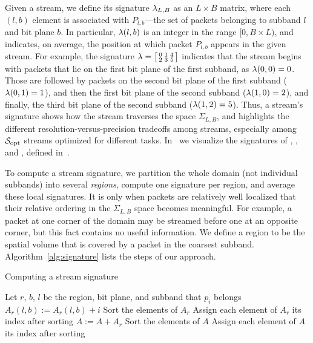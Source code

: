 Given a stream, we define its signature $\sgn_{L,B}$ as an $L \times B$ matrix, where each $(l,b)$
element is associated with $P_{l,b}$---the set of packets belonging to subband $l$ and bit plane
$b$. In particular, $\sgn(l,b)$ is an integer in the range $[0, B\times L)$, and indicates, on
average, the position at which packet $P_{l,b}$ appears in the given stream. For example, the
signature $\sgn=\bigl[ \begin{smallmatrix}0 & 1 & 4\\ 2 & 3 & 5\end{smallmatrix}\bigr]$ indicates
that the stream begins with packets that lie on the first bit plane of the first subband, as
$\sgn(0,0)=0$. Those are followed by packets on the second bit plane of the first subband
($\sgn(0,1)=1$), and then the first bit plane of the second subband ($\sgn(1,0)=2$), and finally,
the third bit plane of the second subband ($\sgn(1,2)=5$). Thus, a stream's signature shows how the
stream traverses the space $\Sigma_{L,B}$, and highlights the different resolution-versus-precision
tradeoffs among streams, especially among $\sopt$ streams optimized for different tasks.
In~ we visualize the signatures of \sbit, \slvl, and \swav, defined
in~.

To compute a stream signature, we partition the whole domain (not individual subbands) into several
\emph{regions}, compute one signature per region, and average these local signatures. It is only
when packets are relatively well localized that their relative ordering in the $\Sigma_{L,B}$ space
becomes meaningful. For example, a packet at one corner of the domain may be streamed before one at
an opposite corner, but this fact contains no useful information. We define a region to be the
spatial volume that is covered by a packet in the coarsest subband. Algorithm~\ref{alg:signature}
lists the steps of our approach.

\begin{algorithm}[h]
  \caption{Computing a stream signature}
  \begin{algorithmic}[1]
			\State Let $r$, $b$, $l$ be the region, bit plane, and subband that $p_i$ belongs
			\State $A_r(l,b) := A_r(l,b)+i$
		\EndFor
			\State Sort the elements of $A_r$
			\State Assign each element of $A_r$ its index after sorting
			\State $A := A+A_r$
		\EndFor
		\State Sort the elements of $A$
		\State Assign each element of $A$ its index after sorting
	\end{algorithmic}
	\label{alg:signature}
\end{algorithm}

